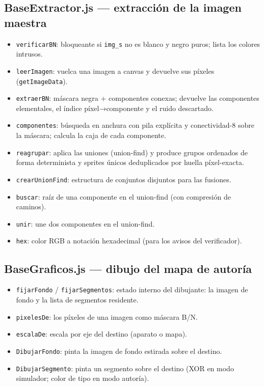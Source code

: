 \documentclass[../main.tex]{subfiles}
\begin{document}
\subsection*{BaseExtractor.js — extracción de la imagen maestra}

\begin{itemize}
	\item \texttt{verificarBN}: bloqueante si \texttt{img\_s} no es
	blanco y negro puros; lista los colores intrusos.
	\item \texttt{leerImagen}: vuelca una imagen a canvas y devuelve
	sus píxeles (\texttt{getImageData}).
	\item \texttt{extraerBN}: máscara negra + componentes conexas;
	devuelve las componentes elementales, el índice píxel→componente y
	el ruido descartado.
	\item \texttt{componentes}: búsqueda en anchura con pila explícita y
	conectividad-8 sobre la máscara; calcula la caja de cada componente.
	\item \texttt{reagrupar}: aplica las uniones (union-find) y produce
	grupos ordenados de forma determinista y sprites únicos
	deduplicados por huella píxel-exacta.
	\item \texttt{crearUnionFind}: estructura de conjuntos disjuntos
	para las fusiones.
	\item \texttt{buscar}: raíz de una componente en el union-find
	(con compresión de caminos).
	\item \texttt{unir}: une dos componentes en el union-find.
	\item \texttt{hex}: color RGB a notación hexadecimal (para los
	avisos del verificador).
\end{itemize}

\subsection*{BaseGraficos.js — dibujo del mapa de autoría}

\begin{itemize}
	\item \texttt{fijarFondo} / \texttt{fijarSegmentos}: estado interno
	del dibujante: la imagen de fondo y la lista de segmentos residente.
	\item \texttt{pixelesDe}: los píxeles de una imagen como máscara
	B/N.
	\item \texttt{escalaDe}: escala por eje del destino (aparato o
	mapa).
	\item \texttt{DibujarFondo}: pinta la imagen de fondo estirada sobre
	el destino.
	\item \texttt{DibujarSegmento}: pinta un segmento sobre el destino
	(XOR en modo simulador; color de tipo en modo autoría).
\end{itemize}
\end{document}
